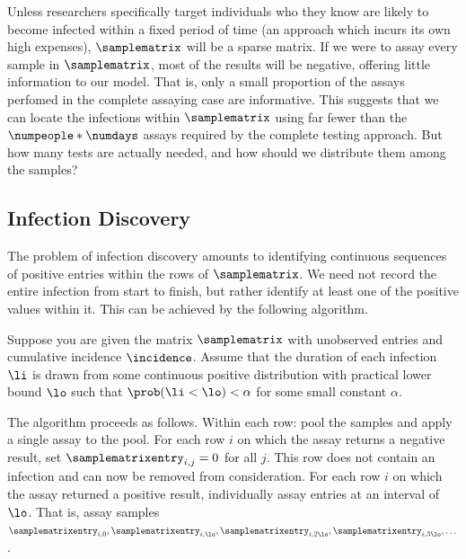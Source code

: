 \documentclass[11pt,notitlepage]{article}
\begin{document}
Unless researchers specifically target individuals who they know are likely to become infected within a fixed period of time (an approach which incurs its own high expenses), $\samplematrix$ will be a sparse matrix.
If we were to assay every sample in $\samplematrix$, most of the results will be negative, offering little information to our model.
That is, only a small proportion of the assays perfomed in the complete assaying case are informative.
This suggests that we can locate the infections within $\samplematrix$ using far fewer than the $\numpeople * \numdays$ assays required by the complete testing approach.
But how many tests are actually needed, and how should we distribute them among the samples?

\subsection{Infection Discovery}\label{sec:methods-infxdiscovery}
The problem of infection discovery amounts to identifying continuous sequences of positive entries within the rows of $\samplematrix$.
We need not record the entire infection from start to finish, but rather identify at least one of the positive values within it.
This can be achieved by the following algorithm.

Suppose you are given the matrix $\samplematrix$ with unobserved entries and cumulative incidence $\incidence$.
Assume that the duration of each infection $\li$ is drawn from some continuous positive distribution with practical lower bound $\lo$ such that $\prob(\li < \lo) < \alpha$ for some small constant $\alpha$.


The algorithm proceeds as follows.
Within each row: pool the samples and apply a single assay to the pool. 
For each row $i$ on which the assay returns a negative result, set $\samplematrixentry_{i,j} = 0$ for all $j$.
This row does not contain an infection and can now be removed from consideration.
For each row $i$ on which the assay returned a positive result, individually assay entries at an interval of $\lo$.
That is, assay samples $\samplematrixentry_{i,0}, \samplematrixentry_{i,\lo}, \samplematrixentry_{i,2\lo}, \samplematrixentry_{i,3\lo}, \dots$. 
\end{document}

